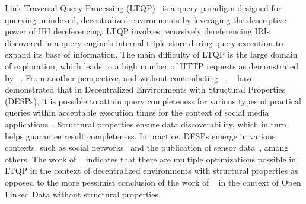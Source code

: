 Link Traversal Query Processing (LTQP)~\cite{Hartig2012} is a query paradigm designed for querying unindexed, decentralized environments by leveraging the descriptive power of IRI dereferencing.
LTQP involves recursively dereferencing IRIs discovered in a query engine's internal triple store during query execution to expand its base of information.
The main difficulty of LTQP is the large domain of exploration, which leads to a high number of HTTP requests as demonstrated by \citeauthor{hartig2016walking}~\cite{hartig2016walking}.
From another perspective, and without contradicting \citeauthor{hartig2016walking}~\cite{hartig2016walking}, \citeauthor{Taelman2023}~\cite{Taelman2023} have demonstrated that in Decentralized Environments with Structural Properties (DESPs), it is possible to attain query completeness for various types of practical queries within acceptable execution times for the context of social media applications~\cite{nielsen1993response}.
Structural properties ensure data discoverability, which in turn helps guarantee result completeness.
In practice, DESPs emerge in various contexts, such as social networks~\cite{Taelman2023} and the publication of sensor data~\cite{tam_iswc_traversalsensortree_2024}, among others.
The work of \citeauthor{Taelman2023}~\cite{Taelman2023} indicates that there are multiple optimizations possible in LTQP in the context of decentralized environments with structural properties as opposed to the
more pessimist conclusion  of the work of \citeauthor{hartig2016walking}~\cite{hartig2016walking} in the context of Open Linked Data without structural properties.

